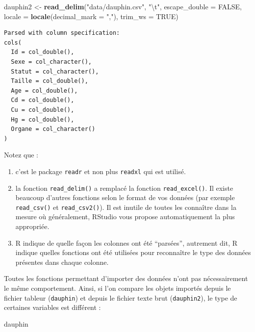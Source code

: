\documentclass[a4paperpaper,]{article}
\newenvironment{Shaded}{\begin{snugshade}}{\end{snugshade}}
\newcommand{\CharTok}[1]{\textcolor[rgb]{0.57,0.30,0.62}{#1}}
\newcommand{\DataTypeTok}[1]{\textcolor[rgb]{0.00,0.34,0.68}{#1}}
\newcommand{\KeywordTok}[1]{\textcolor[rgb]{0.12,0.11,0.11}{\textbf{#1}}}
\newcommand{\NormalTok}[1]{\textcolor[rgb]{0.12,0.11,0.11}{#1}}
\newcommand{\OtherTok}[1]{\textcolor[rgb]{0.00,0.43,0.16}{#1}}
\newcommand{\StringTok}[1]{\textcolor[rgb]{0.75,0.01,0.01}{#1}}
\providecommand{\tightlist}{%
  \setlength{\itemsep}{0pt}\setlength{\parskip}{0pt}}
\begin{document}
\begin{Shaded}
\begin{Highlighting}[]
\NormalTok{dauphin2 <-}\StringTok{ }\KeywordTok{read_delim}\NormalTok{(}\StringTok{"data/dauphin.csv"}\NormalTok{, }\StringTok{"}\CharTok{\textbackslash{}t}\StringTok{"}\NormalTok{, }\DataTypeTok{escape_double =} \OtherTok{FALSE}\NormalTok{, }
    \DataTypeTok{locale =} \KeywordTok{locale}\NormalTok{(}\DataTypeTok{decimal_mark =} \StringTok{","}\NormalTok{), }\DataTypeTok{trim_ws =} \OtherTok{TRUE}\NormalTok{)}
\end{Highlighting}
\end{Shaded}

\begin{verbatim}
Parsed with column specification:
cols(
  Id = col_double(),
  Sexe = col_character(),
  Statut = col_character(),
  Taille = col_double(),
  Age = col_double(),
  Cd = col_double(),
  Cu = col_double(),
  Hg = col_double(),
  Organe = col_character()
)
\end{verbatim}

Notez que :

\begin{enumerate}
\def\labelenumi{\arabic{enumi}.}
\tightlist
\item
  c'est le package \texttt{readr} et non plus \texttt{readxl} qui est utilisé.
\item
  la fonction \texttt{read\_delim()} a remplacé la fonction \texttt{read\_excel()}. Il existe beaucoup d'autres fonctions selon le format de vos données (par exemple \texttt{read\_csv()} et \texttt{read\_csv2()}). Il est inutile de toutes les connaître dans la mesure où généralement, RStudio vous propose automatiquement la plus appropriée.
\item
  R indique de quelle façon les colonnes ont été ``parsées'', autrement dit, R indique quelles fonctions ont été utilisées pour reconnaître le type des données présentes dans chaque colonne.
\end{enumerate}

Toutes les fonctions permettant d'importer des données n'ont pas nécessairement le même comportement. Ainsi, si l'on compare les objets importés depuis le fichier tableur (\texttt{dauphin}) et depuis le fichier texte brut (\texttt{dauphin2}), le type de certaines variables est différent :

\begin{Shaded}
\begin{Highlighting}[]
\NormalTok{dauphin}
\end{Highlighting}
\end{Shaded}
\end{document}

